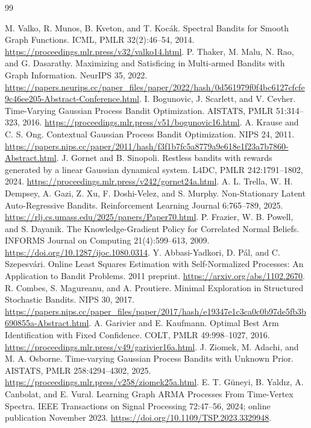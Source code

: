 \documentclass[11pt]{article}
\begin{document}
\begin{thebibliography}{99}
\raggedright
{} M. Valko, R. Munos, B. Kveton, and T. Koc\'{a}k. Spectral Bandits for Smooth Graph Functions. ICML, PMLR 32(2):46--54, 2014. \url{https://proceedings.mlr.press/v32/valko14.html}.
 P. Thaker, M. Malu, N. Rao, and G. Dasarathy. Maximizing and Satisficing in Multi-armed Bandits with Graph Information. NeurIPS 35, 2022. \url{https://papers.neurips.cc/paper_files/paper/2022/hash/0d561979f0f4bc6127cfcfe9c46ee205-Abstract-Conference.html}.
 I. Bogunovic, J. Scarlett, and V. Cevher. Time-Varying Gaussian Process Bandit Optimization. AISTATS, PMLR 51:314--323, 2016. \url{https://proceedings.mlr.press/v51/bogunovic16.html}.
 A. Krause and C. S. Ong. Contextual Gaussian Process Bandit Optimization. NIPS 24, 2011. \url{https://papers.nips.cc/paper/2011/hash/f3f1b7fc5a8779a9e618e1f23a7b7860-Abstract.html}.
 J. Gornet and B. Sinopoli. Restless bandits with rewards generated by a linear Gaussian dynamical system. L4DC, PMLR 242:1791--1802, 2024. \url{https://proceedings.mlr.press/v242/gornet24a.html}.
 A. L. Trella, W. H. Dempsey, A. Gazi, Z. Xu, F. Doshi-Velez, and S. Murphy. Non-Stationary Latent Auto-Regressive Bandits. Reinforcement Learning Journal 6:765--789, 2025. \url{https://rlj.cs.umass.edu/2025/papers/Paper70.html}.
 P. Frazier, W. B. Powell, and S. Dayanik. The Knowledge-Gradient Policy for Correlated Normal Beliefs. INFORMS Journal on Computing 21(4):599--613, 2009. \url{https://doi.org/10.1287/ijoc.1080.0314}.
 Y. Abbasi-Yadkori, D. P\'{a}l, and C. Szepesv\'{a}ri. Online Least Squares Estimation with Self-Normalized Processes: An Application to Bandit Problems. 2011 preprint. \url{https://arxiv.org/abs/1102.2670}.
 R. Combes, S. Magureanu, and A. Proutiere. Minimal Exploration in Structured Stochastic Bandits. NIPS 30, 2017. \url{https://papers.nips.cc/paper_files/paper/2017/hash/e19347e1c3ca0c0b97de5fb3b690855a-Abstract.html}.
 A. Garivier and E. Kaufmann. Optimal Best Arm Identification with Fixed Confidence. COLT, PMLR 49:998--1027, 2016. \url{https://proceedings.mlr.press/v49/garivier16a.html}.
 J. Ziomek, M. Adachi, and M. A. Osborne. Time-varying Gaussian Process Bandits with Unknown Prior. AISTATS, PMLR 258:4294--4302, 2025. \url{https://proceedings.mlr.press/v258/ziomek25a.html}.
 E. T. G\"uneyi, B. Yald\i z, A. Canbolat, and E. Vural. Learning Graph ARMA Processes From Time-Vertex Spectra. IEEE Transactions on Signal Processing 72:47--56, 2024; online publication November 2023. \url{https://doi.org/10.1109/TSP.2023.3329948}.
\end{thebibliography}
\end{document}
